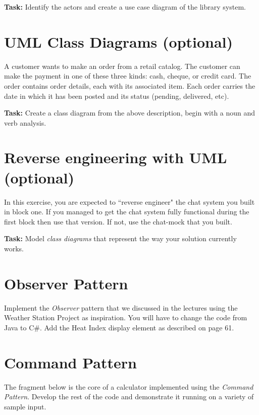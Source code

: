\documentclass{article}
\begin{document}
  \noindent \textbf{Task:} Identify the actors and create a use case diagram of the library system.




\section{UML Class Diagrams (optional)}

  A customer wants to make an order from a retail catalog. The customer can make the payment in one of these three kinds: cash, cheque, or credit card. The order contains order details, each with its associated item. Each order carries the date in which it has been posted and its status (pending, delivered, etc).

\vspace{0.3cm}

  \noindent \textbf{Task:} Create a class diagram from the above description, begin with a noun and verb analysis.




\section{ Reverse engineering with UML (optional)}
    In this exercise, you are expected to ``reverse engineer" the chat system you built in block one. If you managed to get the chat system fully functional during the first block then use that version. If not, use the chat-mock that you built.

 \vspace{0.3cm}

  \noindent   \textbf{Task:} Model \emph{class diagrams} that represent the way your solution currently works.









\pagebreak
\section{Observer Pattern}
    Implement the \emph{Observer} pattern that we discussed in the lectures using the 
    Weather Station Project as inspiration. You will have to change the code from Java to C\#. 
    Add the Heat Index display element as described on page 61.


\section{Command Pattern}
  The fragment below is the core of a calculator implemented using the 
  \emph{Command Pattern}. Develop the rest of the code and demonstrate it running on a variety
  of sample input.
 
\end{document}
